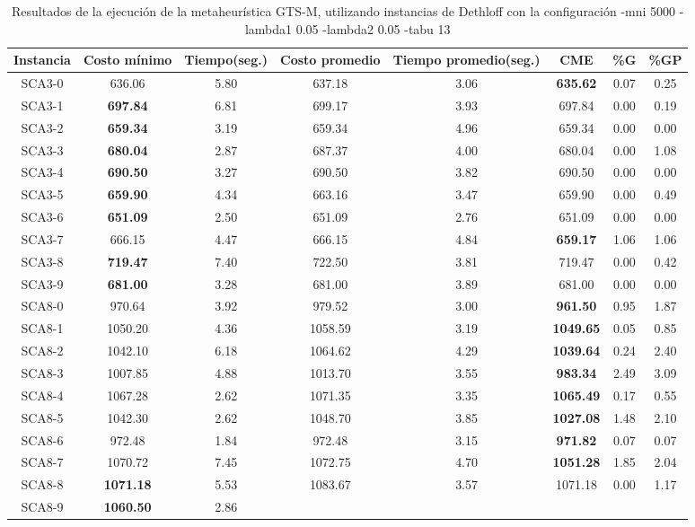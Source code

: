 \begin{table}[h]
\caption{Resultados de la ejecución de la metaheurística GTS-M, utilizando instancias de Dethloff con la configuración -mni 5000 -lambda1 0.05 -lambda2 0.05 -tabu 13}
\centering
\small
\begin{tabular}{c c c c c c c c}
\hline\hline
Instancia & Costo mínimo & Tiempo(seg.) & Costo promedio & Tiempo promedio(seg.) & CME & \%G & \%GP \\ [0.5ex]
\hline
SCA3-0 & 636.06 & 5.80 & 
637.18 & 3.06 & \bf{635.62} & 
0.07 & 0.25\\SCA3-1 & \bf{697.84} & 6.81 & 
699.17 & 3.93 & 697.84 & 0.00
 & 0.19\\SCA3-2 & \bf{659.34} & 3.19 & 
659.34 & 4.96 & 659.34 & 0.00
 & 0.00\\
SCA3-3 & \bf{680.04} & 2.87 & 
687.37 & 4.00 & 680.04 & 0.00
 & 1.08\\SCA3-4 & \bf{690.50} & 3.27 & 
690.50 & 3.82 & 690.50 & 0.00
 & 0.00\\
SCA3-5 & \bf{659.90} & 4.34 & 
663.16 & 3.47 & 659.90 & 0.00
 & 0.49\\SCA3-6 & \bf{651.09} & 2.50 & 
651.09 & 2.76 & 651.09 & 0.00
 & 0.00\\
SCA3-7 & 666.15 & 4.47 & 
666.15 & 4.84 & \bf{659.17} & 
1.06 & 1.06\\SCA3-8 & \bf{719.47} & 7.40 & 
722.50 & 3.81 & 719.47 & 0.00
 & 0.42\\SCA3-9 & \bf{681.00} & 3.28 & 
681.00 & 3.89 & 681.00 & 0.00
 & 0.00\\
SCA8-0 & 970.64 & 3.92 & 
979.52 & 3.00 & \bf{961.50} & 
0.95 & 1.87\\SCA8-1 & 1050.20 & 4.36 & 
1058.59 & 3.19 & \bf{1049.65} & 
0.05 & 0.85\\SCA8-2 & 1042.10 & 6.18 & 
1064.62 & 4.29 & \bf{1039.64} & 
0.24 & 2.40\\SCA8-3 & 1007.85 & 4.88 & 
1013.70 & 3.55 & \bf{983.34} & 
2.49 & 3.09\\SCA8-4 & 1067.28 & 2.62 & 
1071.35 & 3.35 & \bf{1065.49} & 
0.17 & 0.55\\SCA8-5 & 1042.30 & 2.62 & 
1048.70 & 3.85 & \bf{1027.08} & 
1.48 & 2.10\\SCA8-6 & 972.48 & 1.84 & 
972.48 & 3.15 & \bf{971.82} & 
0.07 & 0.07\\SCA8-7 & 1070.72 & 7.45 & 
1072.75 & 4.70 & \bf{1051.28} & 
1.85 & 2.04\\SCA8-8 & \bf{1071.18} & 5.53 & 
1083.67 & 3.57 & 1071.18 & 0.00
 & 1.17\\SCA8-9 & \bf{1060.50} & 2.86 & 

\end{tabular}
\end{table}
